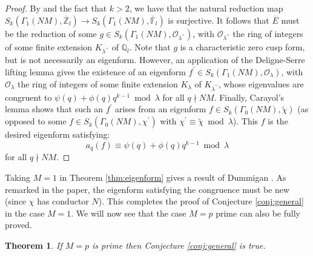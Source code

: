 \documentclass{amsart}
\theoremstyle{plain}
\newtheorem{theorem}{Theorem}[section]
\theoremstyle{definition}
\begin{document}
\begin{proof}
By \cite[Lemma 1.9]{edixhoven_1997} and the fact that $k > 2$, we have that the natural reduction map $S_k(\Gamma_1(NM), \overline{\mathbb{Z}}_l)\rightarrow S_k(\Gamma_1(NM), \overline{\mathbb{F}}_l)$ is surjective. It follows that $\overline{E}$ must be the reduction of some $g \in S_k(\Gamma_1(NM), \mathcal{O}_{\lambda^{\prime\prime}})$, with $\mathcal{O}_{\lambda^{\prime\prime}}$ the ring of integers of some finite extension $K_{\lambda^{\prime\prime}}$ of $\mathbb{Q}_l$. Note that $g$ is a characteristic zero cusp form, but is not necessarily an eigenform. However, an application of the Deligne-Serre lifting lemma \cite[Lemma 6.11]{deligne_1974} gives the existence of an eigenform $f^\prime \in S_k(\Gamma_1(NM), \mathcal{O}_{\lambda})$, with $\mathcal{O}_\lambda$ the ring of integers of some finite extension $K_\lambda$ of $K_{\lambda^{\prime\prime}}$, whose eigenvalues are congruent to $\psi(q) + \phi(q)q^{k-1} \bmod \lambda$ for all $q \nmid NM$. Finally, Carayol's lemma \cite[Proposition 1.10]{edixhoven_1997} shows that such an $f^\prime$ arises from an eigenform $f \in S_k(\Gamma_0(NM), \tilde{\chi})$ (as opposed to some $f \in S_k(\Gamma_0(NM), \chi^\prime)$ with $\chi^\prime \equiv \tilde{\chi} \bmod \lambda$). This $f$ is the desired eigenform satisfying:
\begin{equation*}
    a_q(f) \equiv \psi(q) + \phi(q)q^{k-1} \bmod \lambda
\end{equation*}
for all $q \nmid NM$.
\end{proof}

Taking $M=1$ in Theorem \ref{thm:eigenform} gives a result of Dummigan \cite[Proposition 2.1]{dummigan_2007}. As remarked in the paper, the eigenform satisfying the congruence must be new (since $\chi$ has conductor $N$). This completes the proof of Conjecture \ref{conj:general} in the case $M=1$. We will now see that the case $M=p$ prime can also be fully proved.

\begin{theorem}
\label{thm:prime}
 If $M=p$ is prime then Conjecture \ref{conj:general} is true.
\end{theorem}
\end{document}
